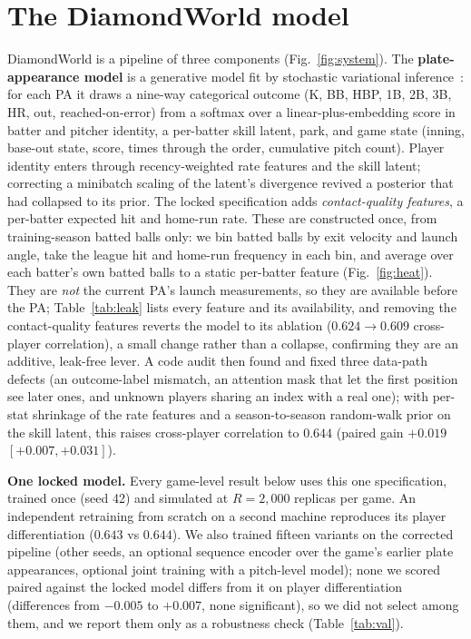 \documentclass[10pt,twocolumn]{article}
\begin{document}
\section{The DiamondWorld model}
DiamondWorld is a pipeline of three components (Fig.~\ref{fig:system}). The \textbf{plate-appearance
model} is a generative model fit by stochastic variational inference~\cite{hoffman,phan}: for each PA
it draws a nine-way categorical outcome (K, BB, HBP, 1B, 2B, 3B, HR, out, reached-on-error) from a
softmax over a linear-plus-embedding score in batter and pitcher identity, a per-batter skill latent,
park, and game state (inning, base-out state, score, times through the order, cumulative pitch count).
Player identity enters through recency-weighted rate features and the skill latent; correcting a
minibatch scaling of the latent's divergence revived a posterior that had collapsed to its prior. The
locked specification adds \emph{contact-quality features}, a per-batter expected hit and home-run rate.
These are constructed once, from training-season batted balls only: we bin batted balls by exit
velocity and launch angle, take the league hit and home-run frequency in each bin, and average over
each batter's own batted balls to a static per-batter feature (Fig.~\ref{fig:heat}). They are
\emph{not} the current PA's launch measurements, so they are available before the PA; Table~\ref{tab:leak}
lists every feature and its availability, and removing the contact-quality features reverts the model to
its ablation ($0.624\!\to\!0.609$ cross-player correlation), a small change rather than a collapse,
confirming they are an additive, leak-free lever. A code audit then found and fixed three data-path
defects (an outcome-label mismatch, an attention mask that let the first position see later ones, and
unknown players sharing an index with a real one); with per-stat shrinkage of the rate features and a
season-to-season random-walk prior on the skill latent, this raises cross-player correlation to $0.644$
(paired gain $+0.019$ $[+0.007,+0.031]$).

\textbf{One locked model.} Every game-level result below uses this one specification, trained once
(seed 42) and simulated at $R{=}2{,}000$ replicas per game. An independent retraining from scratch on a
second machine reproduces its player differentiation ($0.643$ vs $0.644$). We also trained fifteen
variants on the corrected pipeline (other seeds, an optional sequence encoder over the game's earlier
plate appearances, optional joint training with a pitch-level model); none we scored paired against
the locked model differs from it on player differentiation (differences from $-0.005$ to $+0.007$, none
significant), so we did not select among them, and we report them only as a robustness check
(Table~\ref{tab:val}).
\end{document}
